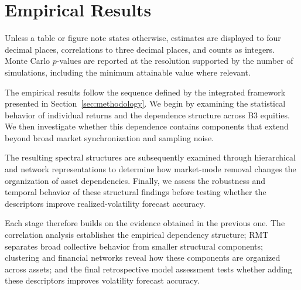\section{Empirical Results}
\label{sec:results}

Unless a table or figure note states otherwise, estimates are displayed to four decimal places, correlations to three decimal places, and counts as integers. Monte Carlo $p$-values are reported at the resolution supported by the number of simulations, including the minimum attainable value where relevant.

The empirical results follow the sequence defined by the integrated framework presented in Section~\ref{sec:methodology}. We begin by examining the statistical behavior of individual returns and the dependence structure across B3 equities. We then investigate whether this dependence contains components that extend beyond broad market synchronization and sampling noise. 

The resulting spectral structures are subsequently examined through hierarchical and network representations to determine how market-mode removal changes the organization of asset dependencies. Finally, we assess the robustness and temporal behavior of these structural findings before testing whether the descriptors improve realized-volatility forecast accuracy.

Each stage therefore builds on the evidence obtained in the previous one. The correlation analysis establishes the empirical dependency structure; RMT separates broad collective behavior from smaller structural components; clustering and financial networks reveal how these components are organized across assets; and the final retrospective model assessment tests whether adding these descriptors improves volatility forecast accuracy.














